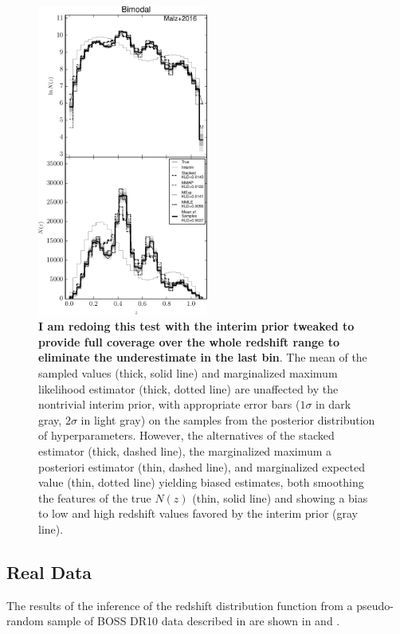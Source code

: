 \begin{figure}
	\includegraphics[width=0.5\textwidth]{figures/chippr/bint_comps.pdf}
	\caption{\textbf{I am redoing this test with the interim prior tweaked to provide full coverage over the whole redshift range to eliminate the 
			underestimate in the last bin}.  
			The mean of the sampled values (thick, solid line) and marginalized maximum likelihood estimator (thick, dotted line) are unaffected by the nontrivial interim prior, with appropriate error bars ($1\sigma$ in dark gray, $2\sigma$ in light gray) on the samples from the posterior distribution of hyperparameters.  
			However, the alternatives of the stacked estimator (thick, dashed line), the marginalized maximum a posteriori estimator (thin, dashed line), and marginalized expected value (thin, dotted line) yielding biased estimates, both smoothing the features of the true $N(z)$ (thin, solid line) and showing a bias to low and high redshift values favored by the interim prior (gray line).}
\end{figure}

\subsection{Real Data}

The results of the inference of the redshift distribution function from a pseudo-random sample of BOSS DR10 data described in  are shown in  and .  


